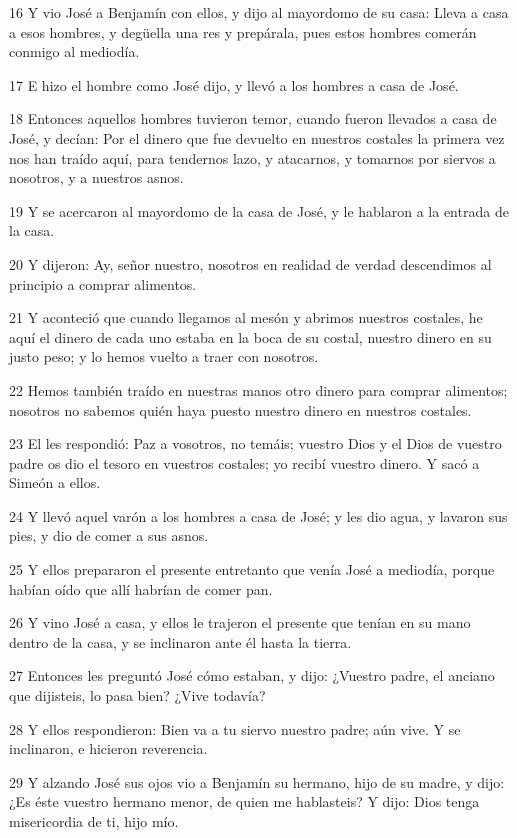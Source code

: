 \par 16 Y vio José a Benjamín con ellos, y dijo al mayordomo de su casa: Lleva a casa a esos hombres, y degüella una res y prepárala, pues estos hombres comerán conmigo al mediodía.
\par 17 E hizo el hombre como José dijo, y llevó a los hombres a casa de José.
\par 18 Entonces aquellos hombres tuvieron temor, cuando fueron llevados a casa de José, y decían: Por el dinero que fue devuelto en nuestros costales la primera vez nos han traído aquí, para tendernos lazo, y atacarnos, y tomarnos por siervos a nosotros, y a nuestros asnos.
\par 19 Y se acercaron al mayordomo de la casa de José, y le hablaron a la entrada de la casa.
\par 20 Y dijeron: Ay, señor nuestro, nosotros en realidad de verdad descendimos al principio a comprar alimentos.
\par 21 Y aconteció que cuando llegamos al mesón y abrimos nuestros costales, he aquí el dinero de cada uno estaba en la boca de su costal, nuestro dinero en su justo peso; y lo hemos vuelto a traer con nosotros.
\par 22 Hemos también traído en nuestras manos otro dinero para comprar alimentos; nosotros no sabemos quién haya puesto nuestro dinero en nuestros costales.
\par 23 El les respondió: Paz a vosotros, no temáis; vuestro Dios y el Dios de vuestro padre os dio el tesoro en vuestros costales; yo recibí vuestro dinero. Y sacó a Simeón a ellos.
\par 24 Y llevó aquel varón a los hombres a casa de José; y les dio agua, y lavaron sus pies, y dio de comer a sus asnos.
\par 25 Y ellos prepararon el presente entretanto que venía José a mediodía, porque habían oído que allí habrían de comer pan.
\par 26 Y vino José a casa, y ellos le trajeron el presente que tenían en su mano dentro de la casa, y se inclinaron ante él hasta la tierra.
\par 27 Entonces les preguntó José cómo estaban, y dijo: ¿Vuestro padre, el anciano que dijisteis, lo pasa bien? ¿Vive todavía?
\par 28 Y ellos respondieron: Bien va a tu siervo nuestro padre; aún vive. Y se inclinaron, e hicieron reverencia.
\par 29 Y alzando José sus ojos vio a Benjamín su hermano, hijo de su madre, y dijo: ¿Es éste vuestro hermano menor, de quien me hablasteis? Y dijo: Dios tenga misericordia de ti, hijo mío.
